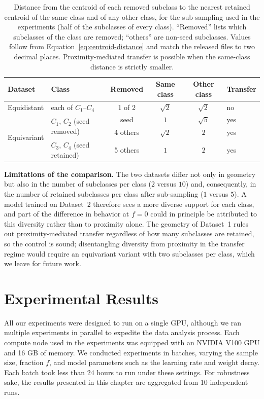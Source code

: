 ﻿\documentclass[../ppgc-tese.tex]{subfiles}
\begin{document}
\begin{table}[t]
    \centering
    \caption{Distance from the centroid of each removed subclass to the nearest retained centroid of the same class and of any other class, for the sub-sampling used in the experiments (half of the subclasses of every class). ``Removed'' lists which subclasses of the class are removed; ``others'' are non-seed subclasses. Values follow from Equation~\ref{eq:centroid-distance} and match the released files to two decimal places. Proximity-mediated transfer is possible when the same-class distance is strictly smaller.}
    \label{tab:removed-neighbors}
    \small
    \begin{tabular}{llcccl}
        \toprule
        Dataset & Class & Removed & Same class & Other class & Transfer \\
        \midrule
        Equidistant & each of $C_1$--$C_4$ & 1 of 2 & $\sqrt{2}$ & $\sqrt{2}$ & no \\
        \midrule
        \multirow{3}{*}{Equivariant} & \multirow{2}{*}{$C_1$, $C_2$ (seed removed)} & seed & $1$ & $\sqrt{5}$ & yes \\
         & & 4 others & $\sqrt{2}$ & $2$ & yes \\
         & $C_3$, $C_4$ (seed retained) & 5 others & $1$ & $2$ & yes \\
        \bottomrule
    \end{tabular}
\end{table}

\noindent\textbf{Limitations of the comparison.}
The two datasets differ not only in geometry but also in the number of subclasses per class ($2$ versus $10$) and, consequently, in the number of retained subclasses per class after sub-sampling ($1$ versus $5$). A model trained on Dataset~2 therefore sees a more diverse support for each class, and part of the difference in behavior at $f = 0$ could in principle be attributed to this diversity rather than to proximity alone. The geometry of Dataset~1 rules out proximity-mediated transfer regardless of how many subclasses are retained, so the control is sound; disentangling diversity from proximity in the transfer regime would require an equivariant variant with two subclasses per class, which we leave for future work.

\section{Experimental Results}\label{sec:results}

All our experiments were designed to run on a single GPU, although we ran multiple experiments in parallel to expedite the data analysis process. Each compute node used in the experiments was equipped with an NVIDIA V100 GPU and 16 GB of memory. We conducted experiments in batches, varying the sample size, fraction $f$, and model parameters such as the learning rate and weight decay. Each batch took less than 24 hours to run under these settings. For robustness sake, the results presented in this chapter are aggregated from 10 independent runs. 
\end{document}
